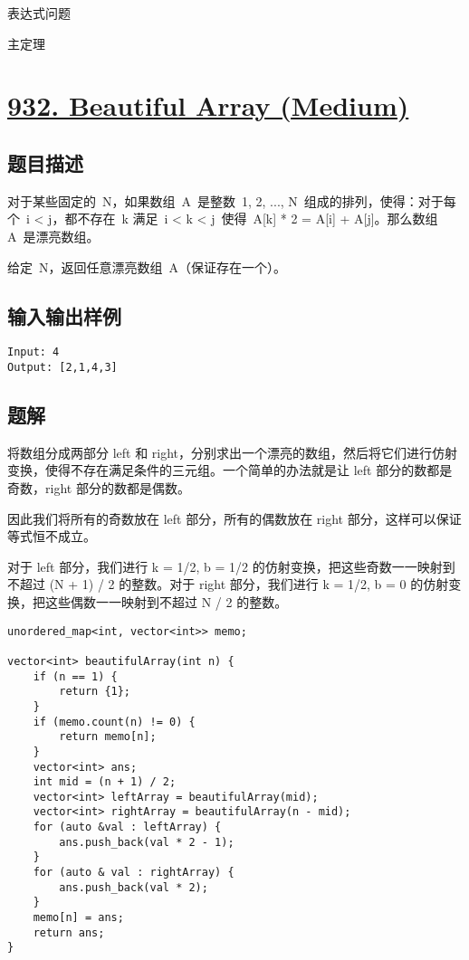 \documentclass[lang=cn,10pt]{elegantbook}
\begin{document}
\begin{introduction}[前情提要]
	\item 表达式问题
	\item 主定理
\end{introduction}

{\color{red}\section{\href{https://leetcode.cn/problems/beautiful-array/}{932. Beautiful Array (Medium)}}} \label{ch8.932}

\subsection*{题目描述}

对于某些固定的 N，如果数组 A 是整数 1, 2, ..., N 组成的排列，使得：对于每个 i < j，都不存在 k 满足 i < k < j 使得 A[k] * 2 = A[i] + A[j]。那么数组 A 是漂亮数组。

给定 N，返回任意漂亮数组 A（保证存在一个）。

\subsection*{输入输出样例}

\begin{lstlisting}
Input: 4
Output: [2,1,4,3]
\end{lstlisting}

\subsection*{题解}

将数组分成两部分 left 和 right，分别求出一个漂亮的数组，然后将它们进行仿射变换，使得不存在满足条件的三元组。一个简单的办法就是让 left 部分的数都是奇数，right 部分的数都是偶数。

因此我们将所有的奇数放在 left 部分，所有的偶数放在 right 部分，这样可以保证等式恒不成立。

对于 left 部分，我们进行 k = 1/2, b = 1/2 的仿射变换，把这些奇数一一映射到不超过 (N + 1) / 2 的整数。对于 right 部分，我们进行 k = 1/2, b = 0 的仿射变换，把这些偶数一一映射到不超过 N / 2 的整数。

\begin{lstlisting}
unordered_map<int, vector<int>> memo;

vector<int> beautifulArray(int n) {
	if (n == 1) {
		return {1};
	}
	if (memo.count(n) != 0) {
		return memo[n];
	}
	vector<int> ans;
	int mid = (n + 1) / 2;
	vector<int> leftArray = beautifulArray(mid);
	vector<int> rightArray = beautifulArray(n - mid);
	for (auto &val : leftArray) {
		ans.push_back(val * 2 - 1);
	}
	for (auto & val : rightArray) {
		ans.push_back(val * 2);
	}
	memo[n] = ans;
	return ans;
}
\end{lstlisting}
\end{document}
